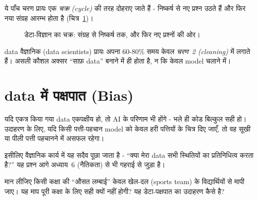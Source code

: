 ये पाँच चरण प्रायः एक \emph{चक्र (cycle)} की तरह दोहराए जाते हैं - निष्कर्ष से नए
प्रश्न उठते हैं और फिर नया संग्रह आरम्भ होता है (चित्र~\ref{fig:ds-cycle})।

\begin{figure}[h]
\centering
{}
\caption{डेटा-विज्ञान का चक्र: संग्रह से निष्कर्ष तक, और फिर नए प्रश्नों की ओर।}
\label{fig:ds-cycle}
\end{figure}

\begin{jante}
data वैज्ञानिक (data scientists) प्रायः अपना 60-80\% समय केवल \emph{चरण~2 (cleaning)}
में लगाते हैं। असली कौशल अक्सर “साफ़ data” बनाने में ही होता है, न कि केवल model चलाने में।
\end{jante}

\section{data में पक्षपात (Bias)}

यदि एकत्र किया गया data एकपक्षीय हो, तो AI के परिणाम भी  होंगे -
भले ही कोड बिल्कुल सही हो। उदाहरण के लिए, यदि किसी पत्ती-पहचान model को केवल हरी पत्तियों
के चित्र दिए जाएँ, तो वह सूखी या पीली पत्ती पहचानने में असफल रहेगा।

इसीलिए वैज्ञानिक कार्य में यह सदैव पूछा जाता है - “क्या मेरा data सभी स्थितियों का
प्रतिनिधित्व करता है?” यह प्रश्न आगे अध्याय~6 (नैतिकता) से भी गहराई से जुड़ा है।

\begin{sochiye}
मान लीजिए किसी कक्षा की “औसत लम्बाई” केवल खेल-दल (sports team) के विद्यार्थियों से
मापी जाए। यह माप पूरी कक्षा के लिए सही क्यों नहीं होगी? यह डेटा-पक्षपात का उदाहरण कैसे है?
\end{sochiye}

